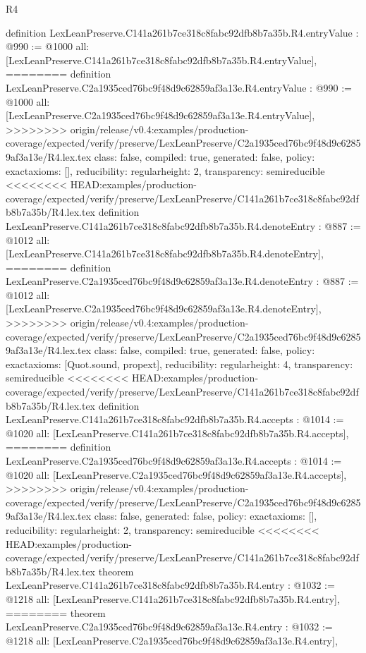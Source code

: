 \begin{lexlean}{R4}
\begin{coremodule}
{{{{{{{{{{{{{{definition LexLeanPreserve.C141a261b7ce318c8fabc92dfb8b7a35b.R4.entryValue : @990 := @1000 {
  all: [LexLeanPreserve.C141a261b7ce318c8fabc92dfb8b7a35b.R4.entryValue],
========
definition LexLeanPreserve.C2a1935ced76bc9f48d9c62859af3a13e.R4.entryValue : @990 := @1000 {
  all: [LexLeanPreserve.C2a1935ced76bc9f48d9c62859af3a13e.R4.entryValue],
>>>>>>>> origin/release/v0.4:examples/production-coverage/expected/verify/preserve/LexLeanPreserve/C2a1935ced76bc9f48d9c62859af3a13e/R4.lex.tex
  class: false,
  compiled: true,
  generated: false,
  policy: exact{axioms: []},
  reducibility: regular{height: 2},
  transparency: semireducible
}
<<<<<<<< HEAD:examples/production-coverage/expected/verify/preserve/LexLeanPreserve/C141a261b7ce318c8fabc92dfb8b7a35b/R4.lex.tex
definition LexLeanPreserve.C141a261b7ce318c8fabc92dfb8b7a35b.R4.denoteEntry : @887 := @1012 {
  all: [LexLeanPreserve.C141a261b7ce318c8fabc92dfb8b7a35b.R4.denoteEntry],
========
definition LexLeanPreserve.C2a1935ced76bc9f48d9c62859af3a13e.R4.denoteEntry : @887 := @1012 {
  all: [LexLeanPreserve.C2a1935ced76bc9f48d9c62859af3a13e.R4.denoteEntry],
>>>>>>>> origin/release/v0.4:examples/production-coverage/expected/verify/preserve/LexLeanPreserve/C2a1935ced76bc9f48d9c62859af3a13e/R4.lex.tex
  class: false,
  compiled: true,
  generated: false,
  policy: exact{axioms: [Quot.sound, propext]},
  reducibility: regular{height: 4},
  transparency: semireducible
}
<<<<<<<< HEAD:examples/production-coverage/expected/verify/preserve/LexLeanPreserve/C141a261b7ce318c8fabc92dfb8b7a35b/R4.lex.tex
definition LexLeanPreserve.C141a261b7ce318c8fabc92dfb8b7a35b.R4.accepts : @1014 := @1020 {
  all: [LexLeanPreserve.C141a261b7ce318c8fabc92dfb8b7a35b.R4.accepts],
========
definition LexLeanPreserve.C2a1935ced76bc9f48d9c62859af3a13e.R4.accepts : @1014 := @1020 {
  all: [LexLeanPreserve.C2a1935ced76bc9f48d9c62859af3a13e.R4.accepts],
>>>>>>>> origin/release/v0.4:examples/production-coverage/expected/verify/preserve/LexLeanPreserve/C2a1935ced76bc9f48d9c62859af3a13e/R4.lex.tex
  class: false,
  generated: false,
  policy: exact{axioms: []},
  reducibility: regular{height: 2},
  transparency: semireducible
}
<<<<<<<< HEAD:examples/production-coverage/expected/verify/preserve/LexLeanPreserve/C141a261b7ce318c8fabc92dfb8b7a35b/R4.lex.tex
theorem LexLeanPreserve.C141a261b7ce318c8fabc92dfb8b7a35b.R4.entry : @1032 := @1218 {
  all: [LexLeanPreserve.C141a261b7ce318c8fabc92dfb8b7a35b.R4.entry],
========
theorem LexLeanPreserve.C2a1935ced76bc9f48d9c62859af3a13e.R4.entry : @1032 := @1218 {
  all: [LexLeanPreserve.C2a1935ced76bc9f48d9c62859af3a13e.R4.entry],
}}}}}}}}}}}}}}}}}}}
\end{coremodule}
\end{lexlean}
